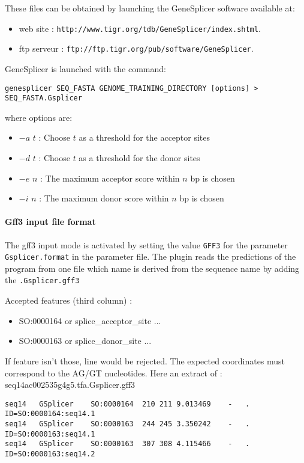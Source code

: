 These files can be obtained by launching the GeneSplicer software
available at:
\begin{itemize}
\item  web site : \texttt{http://www.tigr.org/tdb/GeneSplicer/index.shtml}.
\item  ftp serveur : \texttt{ftp://ftp.tigr.org/pub/software/GeneSplicer}.
\end{itemize}

GeneSplicer is launched with the command:
\begin{Verbatim}[fontsize=\small]
genesplicer SEQ_FASTA GENOME_TRAINING_DIRECTORY [options] > SEQ_FASTA.Gsplicer
\end{Verbatim}
where options are:
\begin{itemize}
\item $-a$ $t$ : Choose $t$ as a threshold for the acceptor sites
\item $-d$ $t$ : Choose $t$ as a threshold for the donor sites
\item $-e$ $n$ : The maximum acceptor score within $n$ bp is chosen
\item $-i$ $n$ : The maximum donor score within $n$ bp is chosen
\end{itemize}

\paragraph{Gff3 input file format}
The gff3 input mode is activated by setting the value \texttt{GFF3} for the parameter
\texttt{Gsplicer.format} in the parameter file.
The plugin reads the predictions of the program from one file which
name is derived from the sequence name by adding the \texttt{.Gsplicer.gff3}

Accepted features (third column) :
\begin{itemize}
\item  SO:0000164 or splice\_acceptor\_site ...
\item  SO:0000163 or splice\_donor\_site ...
\end{itemize}
If feature isn't those, line would be rejected. The expected coordinates must correspond to the AG/GT nucleotides.
Here an extract of : seq14ac002535g4g5.tfa.Gsplicer.gff3
\begin{Verbatim}[fontsize=\tiny]
seq14	GSplicer	SO:0000164	210	211	9.013469	-	.	ID=SO:0000164:seq14.1
seq14	GSplicer	SO:0000163	244	245	3.350242	-	.	ID=SO:0000163:seq14.1
seq14	GSplicer	SO:0000163	307	308	4.115466	-	.	ID=SO:0000163:seq14.2
\end{Verbatim}

